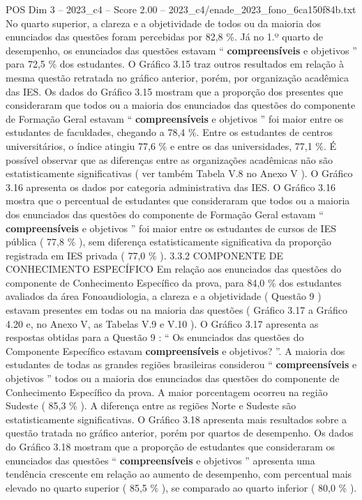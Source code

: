 \begin{textsample}{POS Dim 3 – 2023\_c4 – Score 2.00 – 2023\_c4/enade\_2023\_fono\_6ca150f84b.txt}
No quarto superior, a clareza e a objetividade de todos ou da maioria dos enunciados das questões foram percebidas por 82,8 \%.
Já no 1.º quarto de desempenho, os enunciados das questões estavam “ \textbf{compreensíveis} e objetivos ” para 72,5 \% dos estudantes.
O Gráfico 3.15 traz outros resultados em relação à mesma questão retratada no gráfico anterior, porém, por organização acadêmica das IES.
Os dados do Gráfico 3.15 mostram que a proporção dos presentes que consideraram que todos ou a maioria dos enunciados das questões do componente de Formação Geral estavam “ \textbf{compreensíveis} e objetivos ” foi maior entre os estudantes de faculdades, chegando a 78,4 \%.
Entre os estudantes de centros universitários, o índice atingiu 77,6 \% e entre os das universidades, 77,1 \%.
É possível observar que as diferenças entre as organizações acadêmicas não são estatisticamente significativas ( ver também Tabela V.8 no Anexo V ).
O Gráfico 3.16 apresenta os dados por categoria administrativa das IES.
O Gráfico 3.16 mostra que o percentual de estudantes que consideraram que todos ou a maioria dos enunciados das questões do componente de Formação Geral estavam “ \textbf{compreensíveis} e objetivos ” foi maior entre os estudantes de cursos de IES pública ( 77,8 \% ), sem diferença estatisticamente significativa da proporção registrada em IES privada ( 77,0 \% ). 3.3.2 COMPONENTE DE CONHECIMENTO ESPECÍFICO Em relação aos enunciados das questões do componente de Conhecimento Específico da prova, para 84,0 \% dos estudantes avaliados da área Fonoaudiologia, a clareza e a objetividade ( Questão 9 ) estavam presentes em todas ou na maioria das questões ( Gráfico 3.17 a Gráfico 4.20 e, no Anexo V, as Tabelas V.9 e V.10 ).
O Gráfico 3.17 apresenta as respostas obtidas para a Questão 9 : “ Os enunciados das questões do Componente Específico estavam \textbf{compreensíveis} e objetivos? ”.
A maioria dos estudantes de todas as grandes regiões brasileiras considerou “ \textbf{compreensíveis} e objetivos ” todos ou a maioria dos enunciados das questões do componente de Conhecimento Específico da prova.
A maior porcentagem ocorreu na região Sudeste ( 85,3 \% ).
A diferença entre as regiões Norte e Sudeste são estatisticamente significativas.
O Gráfico 3.18 apresenta mais resultados sobre a questão tratada no gráfico anterior, porém por quartos de desempenho.
Os dados do Gráfico 3.18 mostram que a proporção de estudantes que consideraram os enunciados das questões “ \textbf{compreensíveis} e objetivos ” apresenta uma tendência crescente em relação ao aumento de desempenho, com percentual mais elevado no quarto superior ( 85,5 \% ), se comparado ao quarto inferior ( 80,0 \% ).

\end{textsample}

